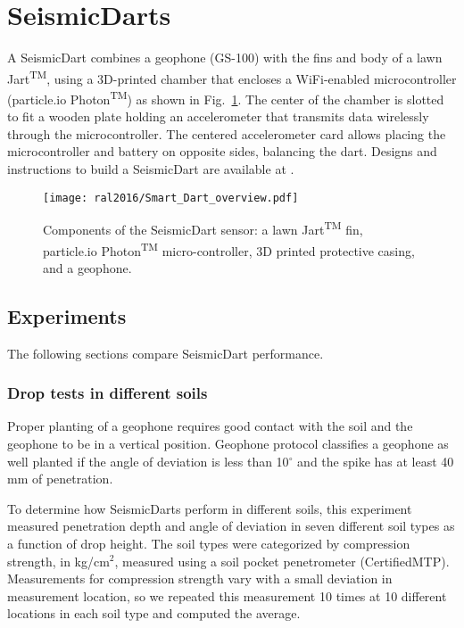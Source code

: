 \section[SeismicDarts]{SeismicDarts}

A SeismicDart combines a geophone (GS-100) with the fins and body of a lawn Jart\textsuperscript{TM}, using a 3D-printed chamber that encloses a WiFi-enabled microcontroller (particle.io Photon\textsuperscript{TM}) as shown in Fig.~\ref{fig:Smart_Dart_overview}.
The center of the chamber is slotted to fit a wooden plate holding an accelerometer that transmits data wirelessly through the microcontroller.
The centered accelerometer card allows placing the microcontroller and battery on opposite sides, balancing the dart.
Designs and instructions to build a SeismicDart are available at \cite{Victor2016Thingiverse}.

\begin{figure} \centering
	{\texttt{[image: ral2016/Smart\_Dart\_overview.pdf]}}
	\caption{
		Components of the SeismicDart sensor: a lawn  Jart\textsuperscript{TM} fin, particle.io Photon\textsuperscript{TM}  micro-controller, 3D printed protective casing, and a geophone.} 
	\label{fig:Smart_Dart_overview}
\end{figure}

\subsection{Experiments}
The following sections compare SeismicDart performance.
\subsubsection{ Drop tests in different soils}
Proper planting of a geophone requires good contact with the soil and the geophone to be in a vertical position.
Geophone protocol classifies a geophone as well planted if the angle of deviation is less than 10$^\circ$ and the spike has at least 40 mm of penetration.

To determine how SeismicDarts perform in different soils, this experiment measured penetration depth and angle of deviation in seven different soil types as a function of drop height.
The soil types were categorized by compression strength, in kg/cm$^2$, measured using a soil pocket penetrometer (CertifiedMTP).
Measurements for compression strength vary with a small deviation in measurement location, so we repeated this measurement 10 times at 10 different locations in each soil type and computed the average.
 
